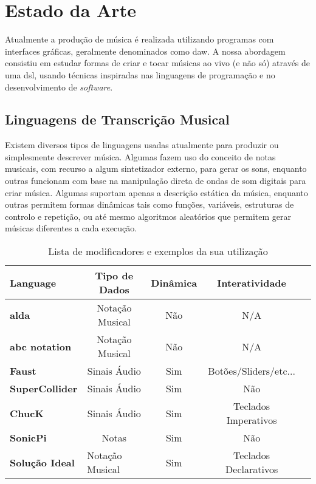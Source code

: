 \chapter{Estado da Arte}
Atualmente a produção de música é realizada utilizando programas com interfaces gráficas, geralmente denominados como \acrfull{daw}. A nossa abordagem consistiu em estudar formas de criar e tocar músicas ao vivo (e não só) através de uma \acrfull{dsl}, usando técnicas inspiradas nas linguagens de programação e no desenvolvimento de \textit{software}.

\section{Linguagens de Transcrição Musical}
Existem diversos tipos de linguagens usadas atualmente para produzir ou simplesmente descrever música. Algumas fazem uso do conceito de notas musicais, com recurso a algum sintetizador externo, para gerar os sons, enquanto outras funcionam com base na manipulação direta de ondas de som digitais para criar música. Algumas suportam apenas a descrição estática da música, enquanto outras permitem formas dinâmicas tais como funções, variáveis, estruturas de controlo e repetição, ou até mesmo algoritmos aleatórios que permitem gerar músicas diferentes a cada execução.

\begin{table}[h]
\centering
\def\arraystretch{1.3}
\begin{tabular}{|l|c|c|c|c|}
\hline
\textbf{Language}      & \textbf{Tipo de Dados}               & \textbf{Dinâmica} & \textbf{Interatividade} \\ \hline
\textbf{alda}          & Notação Musical                      & Não               & N/A                     \\ \hline
\textbf{abc notation}  & Notação Musical                      & Não               & N/A                     \\ \hline
\textbf{Faust}         & Sinais Áudio                         & Sim               & Botões/Sliders/etc...   \\ \hline
\textbf{SuperCollider} & Sinais Áudio                         & Sim               & Não                     \\ \hline
\textbf{ChucK}         & Sinais Áudio                         & Sim               & Teclados Imperativos        \\ \hline
\textbf{SonicPi}       & Notas                                & Sim               & Não                     \\ \hline \hline
\textbf{Solução Ideal} & \multicolumn{1}{l|}{Notação Musical} & Sim               & Teclados Declarativos   \\ \hline
\end{tabular}
\caption{Lista de modificadores e exemplos da sua utilização}
\label{tab:comparison}
\end{table}

